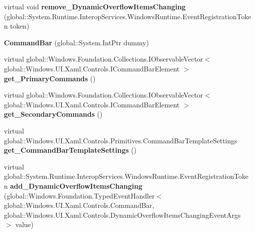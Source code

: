 \begin{DoxyCompactItemize}
virtual void {\bfseries remove\+\_\+\+Dynamic\+Overflow\+Items\+Changing} (global\+::\+System.\+Runtime.\+Interop\+Services.\+Windows\+Runtime.\+Event\+Registration\+Token token)
\item 
\mbox{\label{class_windows_1_1_u_i_1_1_xaml_1_1_controls_1_1_command_bar_a9a0fc839b78496edf0afaebb86ed91bb}} 
{\bfseries Command\+Bar} (global\+::\+System.\+Int\+Ptr dummy)
\item 
\mbox{\label{class_windows_1_1_u_i_1_1_xaml_1_1_controls_1_1_command_bar_ae88ea6c40bfe9ef1b7d7ddbc13b1f9b9}} 
virtual global\+::\+Windows.\+Foundation.\+Collections.\+I\+Observable\+Vector$<$ global\+::\+Windows.\+U\+I.\+Xaml.\+Controls.\+I\+Command\+Bar\+Element $>$ {\bfseries get\+\_\+\+Primary\+Commands} ()
\item 
\mbox{\label{class_windows_1_1_u_i_1_1_xaml_1_1_controls_1_1_command_bar_a072695ed5c57aaec6c85a771fab759a9}} 
virtual global\+::\+Windows.\+Foundation.\+Collections.\+I\+Observable\+Vector$<$ global\+::\+Windows.\+U\+I.\+Xaml.\+Controls.\+I\+Command\+Bar\+Element $>$ {\bfseries get\+\_\+\+Secondary\+Commands} ()
\item 
\mbox{\label{class_windows_1_1_u_i_1_1_xaml_1_1_controls_1_1_command_bar_a3c347a4844a2ab249e968e1e53766ab0}} 
virtual global\+::\+Windows.\+U\+I.\+Xaml.\+Controls.\+Primitives.\+Command\+Bar\+Template\+Settings {\bfseries get\+\_\+\+Command\+Bar\+Template\+Settings} ()
\item 
\mbox{\label{class_windows_1_1_u_i_1_1_xaml_1_1_controls_1_1_command_bar_a1a44ae0c71e258f2cf660c142388ef5a}} 
virtual global\+::\+System.\+Runtime.\+Interop\+Services.\+Windows\+Runtime.\+Event\+Registration\+Token {\bfseries add\+\_\+\+Dynamic\+Overflow\+Items\+Changing} (global\+::\+Windows.\+Foundation.\+Typed\+Event\+Handler$<$ global\+::\+Windows.\+U\+I.\+Xaml.\+Controls.\+Command\+Bar, global\+::\+Windows.\+U\+I.\+Xaml.\+Controls.\+Dynamic\+Overflow\+Items\+Changing\+Event\+Args $>$ value)
\item 
\mbox{\label{class_windows_1_1_u_i_1_1_xaml_1_1_controls_1_1_command_bar_a0c78fff54eb4b6fe6739fa33dedab6f5}} 

\end{DoxyCompactItemize}

